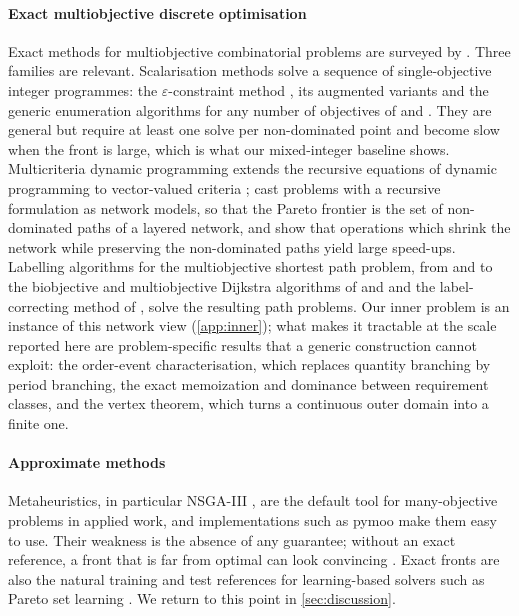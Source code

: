 \documentclass[preprint,12pt,authoryear]{elsarticle}
\begin{document}
\paragraph{Exact multiobjective discrete optimisation}
Exact methods for multiobjective combinatorial problems are surveyed by
\citet{Ehrgott2005}. Three families are relevant. Scalarisation methods solve a sequence of
single-objective integer programmes: the $\varepsilon$-constraint method
\citep{Haimes1971}, its augmented variants \citep{Mavrotas2009} and the generic enumeration
algorithms for any number of objectives of \citet{KirlikSayin2014} and
\citet{TambyVanderpooten2021}. They are general but require at least one solve per
non-dominated point and become slow when the front is large, which is what our
mixed-integer baseline shows. Multicriteria dynamic programming extends the recursive
equations of dynamic programming to vector-valued criteria \citep{VillarrealKarwan1982,
Carraway1990}; \citet{Bergman2022} cast problems with a recursive formulation as network
models, so that the Pareto frontier is the set of non-dominated paths of a layered network,
and show that operations which shrink the network while preserving the non-dominated
paths yield large speed-ups. Labelling algorithms for the multiobjective shortest path
problem, from \citet{Hansen1980} and \citet{Martins1984} to the biobjective and
multiobjective Dijkstra algorithms of \citet{SedenoNoda2019} and \citet{Maristany2021} and
the label-correcting method of \citet{Kergosien2022}, solve the resulting path problems.
Our inner problem is an instance of this network view (\cref{app:inner}); what makes it
tractable at the scale reported here are problem-specific results that a generic
construction cannot exploit: the order-event characterisation, which replaces quantity
branching by period branching, the exact memoization and dominance between requirement
classes, and the vertex theorem, which turns a continuous outer domain into a finite one.

\paragraph{Approximate methods}
Metaheuristics, in particular NSGA-III \citep{DebJain2014}, are the default tool for
many-objective problems in applied work, and implementations such as pymoo
\citep{BlankDeb2020} make them easy to use. Their weakness is the absence of any
guarantee; without an exact reference, a front that is far from optimal can look
convincing \citep{Sorensen2015}. Exact fronts are also the natural training and test
references for learning-based solvers such as Pareto set learning \citep{Lin2022PSL}. We
return to this point in \cref{sec:discussion}.
\end{document}

